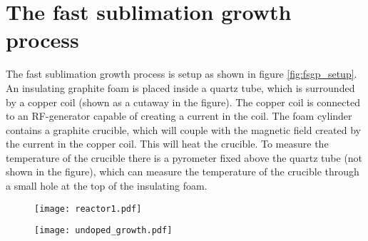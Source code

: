 \section{The fast sublimation growth process}
The fast sublimation growth process is setup as shown in figure \ref{fig:fsgp_setup}. An insulating graphite foam is placed inside a quartz tube, which is surrounded by a copper coil (shown as a cutaway in the figure). The copper coil is connected to an RF-generator capable of creating a current in the coil. The foam cylinder contains a graphite crucible, which will couple with the magnetic field created by the current in the copper coil. This will heat the crucible. To measure the temperature of the crucible there is a pyrometer fixed above the quartz tube (not shown in the figure), which can measure the temperature of the crucible through a small hole at the top of the insulating foam. 

\begin{figure}[h]
\centering
\begin{minipage}{.5\textwidth}
  \centering
  \texttt{[image: reactor1.pdf]}
  \label{fig:fsgp_setup}
\end{minipage}%
\begin{minipage}{.5\textwidth}
  \centering
  \texttt{[image: undoped\_growth.pdf]}
  \label{fig:undoped_growth}
\end{minipage}
\end{figure}


